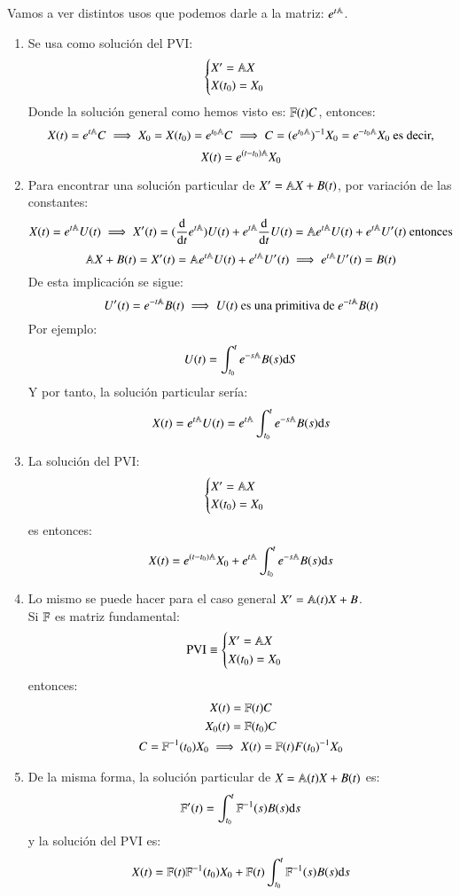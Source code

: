 Vamos a ver distintos usos que podemos darle a la matriz: $e^{t\mathbb{A}}$.
\begin{enumerate}
    \item Se usa como solución del PVI:
    $$
        \begin{cases}
            X' = \mathbb{A} X\\
            X(t_0) = X_0
        \end{cases}
    $$
    Donde la solución general como hemos visto es: $\mathbb{F}(t) C$, entonces:
    $$
        X(t) = e^{t\mathbb{A}} C \implies X_0 = X(t_0) = e^{t_0\mathbb{A}} C \implies C = (e^{t_0 \mathbb{A}})^{-1} X_0 = e^{-t_0\mathbb{A}} X_0 \text{ es decir,}
    $$
    $$
        X(t) = e^{(t-t_0)\mathbb{A}} X_0
    $$
    \item Para encontrar una solución particular de $X' = \mathbb{A} X + B(t)$, por variación de las constantes:
    $$
        X(t) = e^{t\mathbb{A}} U(t) \implies X'(t) = (\frac{\mathrm{d}}{\mathrm{d}t}e^{t\mathbb{A}})U(t) + e^{t\mathbb{A}} \frac{\mathrm{d}}{\mathrm{d}t}U(t) = \mathbb{A} e^{t\mathbb{A}} U(t) + e^{t\mathbb{A}}U'(t) \text{ entonces}
    $$
    $$
        \mathbb{A} X + B(t) = X'(t) = \mathbb{A} e^{t\mathbb{A}} U(t) + e^{t\mathbb{A}} U'(t) \implies e^{t\mathbb{A}}U'(t) = B(t)
    $$
    De esta implicación se sigue:
    $$
        U'(t) = e^{-t\mathbb{A}}B(t) \implies U(t) \text{ es una primitiva de } e^{-t\mathbb{A}}B(t)
    $$
    Por ejemplo:
    $$
        U(t) = \int_{t_0}^t e^{-s\mathbb{A}}B(s)\mathrm{d} S
    $$
    Y por tanto, la solución particular sería:
    $$
        X(t) = e^{t \mathbb{A}}U(t) = e^{t\mathbb{A}} \int_{t_0}^t e^{-s\mathbb{A}}B(s)\mathrm{d} s
    $$
    \item La solución del PVI:
    $$
        \begin{cases}
            X' = \mathbb{A} X\\
            X(t_0) = X_0
        \end{cases}
    $$ es entonces:
    $$
        X(t) = e^{(t-t_0) \mathbb{A}}X_0 + e^{t\mathbb{A}} \int_{t_0}^t e^{-s\mathbb{A}}B(s)\mathrm{d} s
    $$
    \item Lo mismo se puede hacer para el caso general $X' = \mathbb{A}(t) X + B$.\\
    Si $\mathbb{F}$ es matriz fundamental:
    $$
        \text{PVI}\equiv \begin{cases}
            X' = \mathbb{A} X\\
            X(t_0) = X_0
        \end{cases}
    $$
    entonces:
    \begin{gather}
        X(t) = \mathbb{F}(t) C\\
        X_0(t) = \mathbb{F}(t_0) C\\
        C = \mathbb{F}^{-1}(t_0)X_0 \implies X(t) = \mathbb{F}(t) F(t_0)^{-1} X_0
    \end{gather}
    \item De la misma forma, la solución particular de $X = \mathbb{A}(t) X + B(t)$ es:
    $$
        \mathbb{F}'(t) = \int_{t_0}^{t} \mathbb{F}^{-1}(s) B(s) \mathrm{d} s
    $$
    y la solución del PVI es:
    $$
        X(t) = \mathbb{F}(t)\mathbb{F}^{-1}(t_0)X_0+\mathbb{F}(t)\int_{t_0}^{t} \mathbb{F}^{-1}(s) B(s) \mathrm{d} s
    $$
\end{enumerate}
